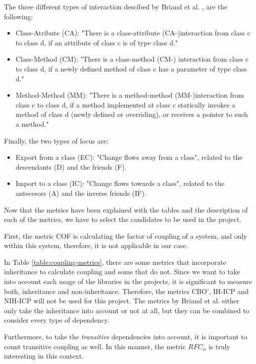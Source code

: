 \bigskip\noindent
The three different types of interaction descibed by Briand et al. \cite{briand1997investigation}, are the following:
\begin{itemize}
    \item Class-Atribute (CA): "There is a class-attribute (CA-)interaction from class c to class d, if an attribute of class c is of type class d."
    \item Class-Method (CM): "There is a class-method (CM-) interaction from class c to class d, if a newly defined method of class c has a parameter of type class d."
    \item Method-Method (MM): "There is a method-method (MM-)interaction from class c to class d, if a method implemented at class c statically invokes a method of class d (newly defined or overriding), or receives a pointer to such a method."
\end{itemize}

\bigskip\noindent
Finally, the two types of locus are:
\begin{itemize}
  \item Export from a class (EC): "Change flows away from a class", related to the descendants (D) and the friends (F).
  \item Import to a class (IC): "Change flows towards a class", related to the antecesors (A) and the inverse friends (IF).
\end{itemize}

\bigskip\noindent
Now that the metrics have been explained with the tables and the description of each of the metrics, we have to select the candidates to be used in the project.

First, the metric COF is calculating the factor of coupling of a system, and only within this system, therefore, it is not applicable in our case.

In Table \ref{table:coupling-metrics}, there are some metrics that incorporate inheritance to calculate coupling and some that do not.
Since we want to take into account each usage of the libraries in the projects, it is significant to measure both, inheritance and non-inheritance.
Therefore, the metrics CBO', IH-ICP and NIH-ICP will not be used for this project. The metrics by Briand et al. either only take the inheritance into account or not at all, but they can be combined to consider every type of dependency.

Furthermore, to take the \textit{transitive} dependencies into account, it is important to count transitive coupling as well.
In this manner, the metric $RFC_\alpha$ is truly interesting in this context.


